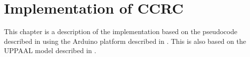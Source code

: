 \chapter{Implementation of CCRC}
This chapter is a description of the implementation based on the pseudocode described in  using the Arduino platform described in . 
This is also based on the UPPAAL model described in .

